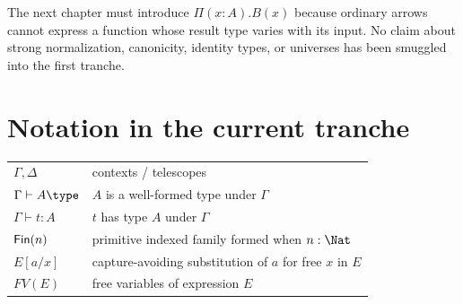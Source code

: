 \documentclass[11pt,openany]{book}
\begin{document}
The next chapter must introduce $\Pi(x:A).B(x)$ because ordinary arrows cannot express a function whose result type varies with its input. No claim about strong normalization, canonicity, identity types, or universes has been smuggled into the first tranche.

\chapter*{Notation in the current tranche}
\begin{tabularx}{\textwidth}{@{}lX@{}}
\toprule
$\Gamma,\Delta$ & contexts / telescopes \\
$\Gamma\vdash A\type$ & $A$ is a well-formed type under $\Gamma$ \\
$\Gamma\vdash t:A$ & $t$ has type $A$ under $\Gamma$ \\
$\mathsf{Fin}(n)$ & primitive indexed family formed when $n:\Nat$ \\
$E[a/x]$ & capture-avoiding substitution of $a$ for free $x$ in $E$ \\
$FV(E)$ & free variables of expression $E$ \\
\bottomrule
\end{tabularx}

\printindex
\end{document}
